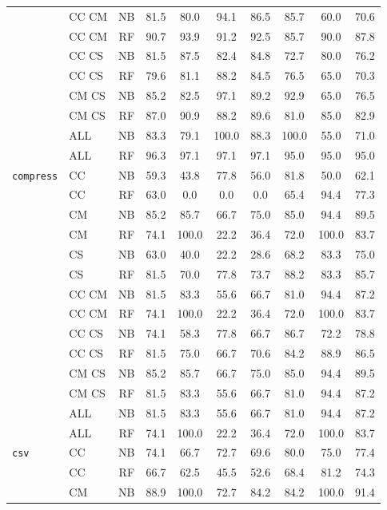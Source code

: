 {\begin{tabular}{l l c | c | c c c | c c c}
& CC CM & NB & 81.5 & 80.0 & 94.1 & 86.5 & 85.7 & 60.0 & 70.6 \\
& CC CM & RF & 90.7 & 93.9 & 91.2 & 92.5 & 85.7 & 90.0 & 87.8 \\
& CC CS & NB & 81.5 & 87.5 & 82.4 & 84.8 & 72.7 & 80.0 & 76.2 \\
& CC CS & RF & 79.6 & 81.1 & 88.2 & 84.5 & 76.5 & 65.0 & 70.3 \\
& CM CS & NB & 85.2 & 82.5 & 97.1 & 89.2 & 92.9 & 65.0 & 76.5 \\
& CM CS & RF & 87.0 & 90.9 & 88.2 & 89.6 & 81.0 & 85.0 & 82.9 \\
& ALL & NB & 83.3 & 79.1 & 100.0 & 88.3 & 100.0 & 55.0 & 71.0 \\
& ALL & RF & 96.3 & 97.1 & 97.1 & 97.1 & 95.0 & 95.0 & 95.0 \\
{\tt compress}
& CC & NB & 59.3 & 43.8 & 77.8 & 56.0 & 81.8 & 50.0 & 62.1 \\
& CC & RF & 63.0 & 0.0 & 0.0 & 0.0 & 65.4 & 94.4 & 77.3 \\
& CM & NB & 85.2 & 85.7 & 66.7 & 75.0 & 85.0 & 94.4 & 89.5 \\
& CM & RF & 74.1 & 100.0 & 22.2 & 36.4 & 72.0 & 100.0 & 83.7 \\
& CS & NB & 63.0 & 40.0 & 22.2 & 28.6 & 68.2 & 83.3 & 75.0 \\
& CS & RF & 81.5 & 70.0 & 77.8 & 73.7 & 88.2 & 83.3 & 85.7 \\
& CC CM & NB & 81.5 & 83.3 & 55.6 & 66.7 & 81.0 & 94.4 & 87.2 \\
& CC CM & RF & 74.1 & 100.0 & 22.2 & 36.4 & 72.0 & 100.0 & 83.7 \\
& CC CS & NB & 74.1 & 58.3 & 77.8 & 66.7 & 86.7 & 72.2 & 78.8 \\
& CC CS & RF & 81.5 & 75.0 & 66.7 & 70.6 & 84.2 & 88.9 & 86.5 \\
& CM CS & NB & 85.2 & 85.7 & 66.7 & 75.0 & 85.0 & 94.4 & 89.5 \\
& CM CS & RF & 81.5 & 83.3 & 55.6 & 66.7 & 81.0 & 94.4 & 87.2 \\
& ALL & NB & 81.5 & 83.3 & 55.6 & 66.7 & 81.0 & 94.4 & 87.2 \\
& ALL & RF & 74.1 & 100.0 & 22.2 & 36.4 & 72.0 & 100.0 & 83.7 \\
{\tt csv}
& CC & NB & 74.1 & 66.7 & 72.7 & 69.6 & 80.0 & 75.0 & 77.4 \\
& CC & RF & 66.7 & 62.5 & 45.5 & 52.6 & 68.4 & 81.2 & 74.3 \\
& CM & NB & 88.9 & 100.0 & 72.7 & 84.2 & 84.2 & 100.0 & 91.4 \\

\end{tabular}}
